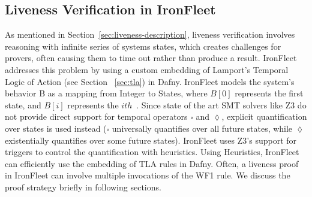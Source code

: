 \documentclass{llncs}
\begin{document}
\subsection{Liveness Verification in IronFleet}\label{sec:liveness-ironfleet}
As mentioned in Section~\ref{sec:liveness-description}, liveness verification involves
reasoning with infinite series of systems states, which creates challenges for 
provers, often causing them to time out rather than produce a result. IronFleet addresses
this problem by using a custom embedding of Lamport's Temporal Logic of Action (see Section 
~\ref{sec:tla}) in Dafny. IronFleet models the system's behavior B as a mapping from Integer to
States, where $B[0]$ represents the first state, and $B[i]$ represents the $ith$~\cite{ironfleet}. 
Since state of the art SMT solvers like Z3 do not provide direct support for temporal operators
$\square$ and $\lozenge$, explicit quantification over states is used instead ($\square$ universally
quantifies over all future states, while $\lozenge$ existentially quantifies over some future states).
IronFleet uses Z3's support for triggers to control the quantification with heuristics. 
Using Heuristics, IronFleet can efficiently use the embedding of TLA rules in Dafny. Often, a liveness proof in 
IronFleet can involve multiple invocations of the WF1 rule. We discuss the proof strategy briefly
in following sections.
\end{document}
